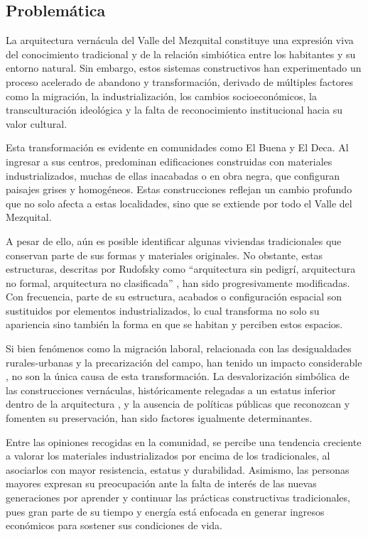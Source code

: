 \subsection{Problemática}

La arquitectura vernácula del Valle del Mezquital constituye una expresión viva del conocimiento tradicional y de la relación simbiótica entre los habitantes y su entorno natural. Sin embargo, estos sistemas constructivos han experimentado un proceso acelerado de abandono y transformación, derivado de múltiples factores como la migración, la industrialización, los cambios socioeconómicos, la transculturación ideológica y la falta de reconocimiento institucional hacia su valor cultural.

Esta transformación es evidente en comunidades como El Buena y El Deca. Al ingresar a sus centros, predominan edificaciones construidas con materiales industrializados, muchas de ellas inacabadas o en obra negra, que configuran paisajes grises y homogéneos. Estas construcciones reflejan un cambio profundo que no solo afecta a estas localidades, sino que se extiende por todo el Valle del Mezquital.

A pesar de ello, aún es posible identificar algunas viviendas tradicionales que conservan parte de sus formas y materiales originales. No obstante, estas estructuras, descritas por Rudofsky como ``arquitectura sin pedigrí, arquitectura no formal, arquitectura no clasificada'' \citep[p. 9]{rudofsky1976arquitectura}, han sido progresivamente modificadas. Con frecuencia, parte de su estructura, acabados o configuración espacial son sustituidos por elementos industrializados, lo cual transforma no solo su apariencia sino también la forma en que se habitan y perciben estos espacios.

Si bien fenómenos como la migración laboral, relacionada con las desigualdades rurales-urbanas y la precarización del campo, han tenido un impacto considerable \citep{monroy2009, boils2010dadho}, no son la única causa de esta transformación. La desvalorización simbólica de las construcciones vernáculas, históricamente relegadas a un estatus inferior dentro de la arquitectura \citep[p. 2]{torrez1999revista}, y la ausencia de políticas públicas que reconozcan y fomenten su preservación, han sido factores igualmente determinantes.

Entre las opiniones recogidas en la comunidad, se percibe una tendencia creciente a valorar los materiales industrializados por encima de los tradicionales, al asociarlos con mayor resistencia, estatus y durabilidad. Asimismo, las personas mayores expresan su preocupación ante la falta de interés de las nuevas generaciones por aprender y continuar las prácticas constructivas tradicionales, pues gran parte de su tiempo y energía está enfocada en generar ingresos económicos para sostener sus condiciones de vida.


